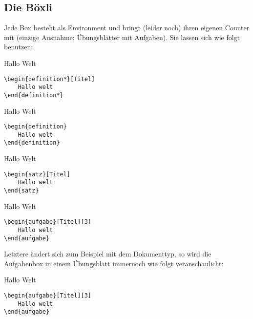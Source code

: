 \subsection[Wie funktionieren Boxen]{Die Böxli}
Jede Box besteht als Environment und bringt (leider noch) ihren eigenen Counter mit (einzige Ausnahme: Übungsblätter mit Aufgaben).
Sie lassen sich wie folgt benutzen:
\begin{multicols}{2}
\begin{definition*}[Titel]
    Hallo Welt
\begin{lstlisting}[style=latex]
\begin{definition*}[Titel]
    Hallo welt
\end{definition*}\end{lstlisting}
\end{definition*}

\begin{definition}
    Hallo Welt
\begin{lstlisting}[style=latex]
\begin{definition}
    Hallo welt
\end{definition}\end{lstlisting}
\end{definition}

\begin{satz}[Titel]
    Hallo Welt
\begin{lstlisting}[style=latex]
\begin{satz}[Titel]
    Hallo welt
\end{satz}\end{lstlisting}
\end{satz}

\begin{aufgabe}[Titel][3]
    Hallo Welt
\begin{lstlisting}[style=latex]
\begin{aufgabe}[Titel][3]
    Hallo welt
\end{aufgabe}\end{lstlisting}
\end{aufgabe}
\end{multicols}
Letztere ändert sich zum Beispiel mit dem Dokumenttyp, so wird die Aufgabenbox in einem Übungsblatt immernoch wie folgt veranschaulicht:
\begin{aufgabe}[Titel][3]
    Hallo Welt
\begin{lstlisting}[style=latex]
\begin{aufgabe}[Titel][3]
    Hallo welt
\end{aufgabe}\end{lstlisting}
\end{aufgabe}
